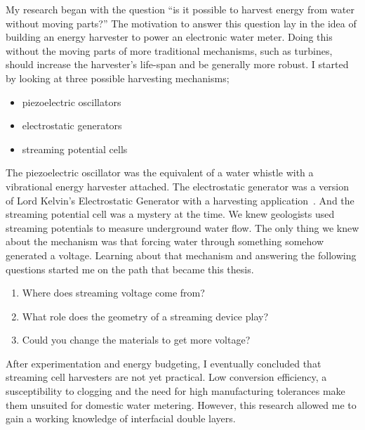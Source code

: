   My research began with the question ``is it possible to harvest energy from water without moving parts?''
  The motivation to answer this question lay in the idea of building an energy harvester to power an electronic water meter.
  Doing this without the moving parts of more traditional mechanisms, such as turbines, should increase the harvester's life-span and be generally more robust.
  I started by looking at three possible harvesting mechanisms;
  \begin{itemize}
    \item piezoelectric oscillators
    \item electrostatic generators
    \item streaming potential cells
  \end{itemize}
  The piezoelectric oscillator was the equivalent of a water whistle with a vibrational energy harvester attached.
  The electrostatic generator was a version of Lord Kelvin's Electrostatic Generator with a harvesting application~\cite{Thomson1867a}.
  And the streaming potential cell was a mystery at the time.
  We knew geologists used streaming potentials to measure underground water flow.
  The only thing we knew about the mechanism was that forcing water through something somehow generated a voltage.
  Learning about that mechanism and answering the following questions started me on the path that became this thesis.
  \begin{enumerate}
    \item Where does streaming voltage come from?
    \item What role does the geometry of a streaming device play?
    \item Could you change the materials to get more voltage?
  \end{enumerate}
  After experimentation and energy budgeting, I eventually concluded that streaming cell harvesters are not yet practical.
  Low conversion efficiency, a susceptibility to clogging and the need for high manufacturing tolerances make them unsuited for domestic water metering.
  However, this research allowed me to gain  a working knowledge of interfacial double layers.

